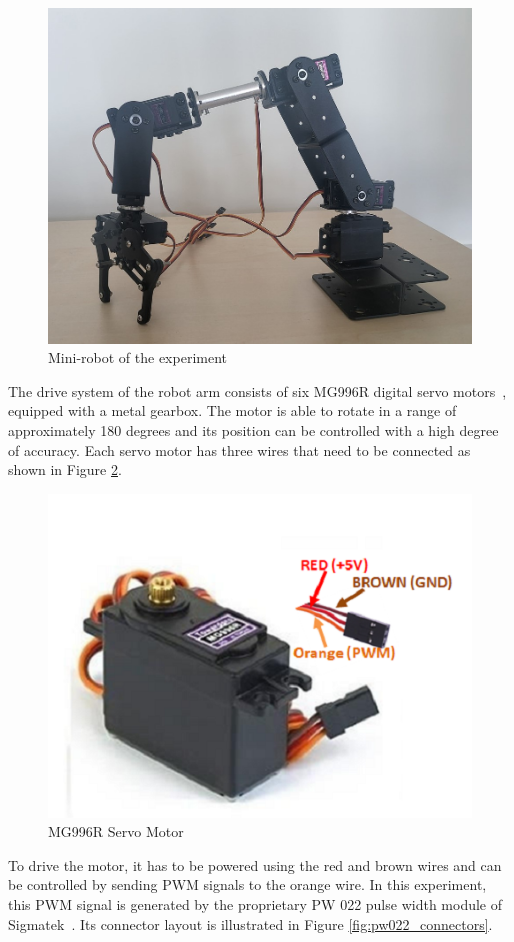 \documentclass[MMR,Master,english]{twbook}
\begin{document}
\begin{figure}[H]
	\centering
	\includegraphics[width=0.45\columnwidth]{img/experiment/mini_robot.jpg}
	\caption[Mini-robot of the experiment]{Mini-robot of the experiment}
	\label{fig:mini_robot}
\end{figure}

\noindent The drive system of the robot arm consists of six MG996R digital servo motors~\cite{MG996RServoMotor}, equipped with a metal gearbox. The motor is able to rotate in a range of approximately 180 degrees and its position can be controlled with a high degree of accuracy. Each servo motor has three wires that need to be connected as shown in Figure \ref{fig:motor_wires}.

\begin{figure}[H]
	\centering
	\includegraphics[width=0.45\columnwidth]{img/experiment/motor_wires.png}
	\caption[MG996R Servo Motor]{MG996R Servo Motor~\cite{MG996RServoMotor}}
	\label{fig:motor_wires}
\end{figure}

\noindent To drive the motor, it has to be powered using the red and brown wires and can be controlled by sending PWM signals to the orange wire. In this experiment, this PWM signal is generated by the proprietary PW 022 pulse width module of Sigmatek~\cite{DigitalOutputSIGMATEK}. Its connector layout is illustrated in Figure \ref{fig:pw022_connectors}.
\end{document}
